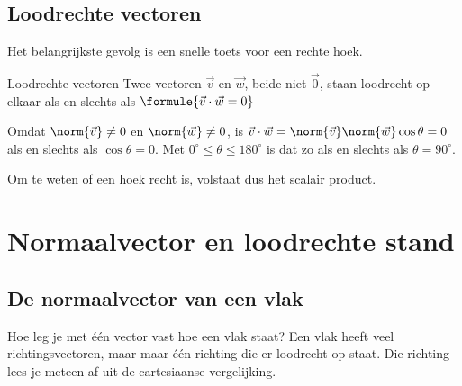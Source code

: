 \subsection{Loodrechte vectoren}

Het belangrijkste gevolg is een snelle toets voor een rechte hoek.

\begin{theorie}
\begin{stelling}{Loodrechte vectoren}
Twee vectoren $\vec v$ en $\vec w$, beide niet $\vec 0$, staan loodrecht op elkaar als en slechts als \quad $\formule{\vec v \cdot \vec w = 0}$
\end{stelling}
\begin{bewijs}
Omdat $\norm{\vec v} \neq 0$ en $\norm{\vec w} \neq 0$, is $\vec v \cdot \vec w = \norm{\vec v}\norm{\vec w}\cos\theta = 0$ als en slechts als $\cos\theta = 0$. Met $0^\circ \leqslant \theta \leqslant 180^\circ$ is dat zo als en slechts als $\theta = 90^\circ$.
\end{bewijs}
\end{theorie}

Om te weten of een hoek recht is, volstaat dus het scalair product.


\begin{oefeningen}
\end{oefeningen}

\section{Normaalvector en loodrechte stand}

\subsection{De normaalvector van een vlak}

Hoe leg je met één vector vast hoe een vlak staat? Een vlak heeft veel richtingsvectoren, maar maar één richting die er loodrecht op staat. Die richting lees je meteen af uit de cartesiaanse vergelijking.

